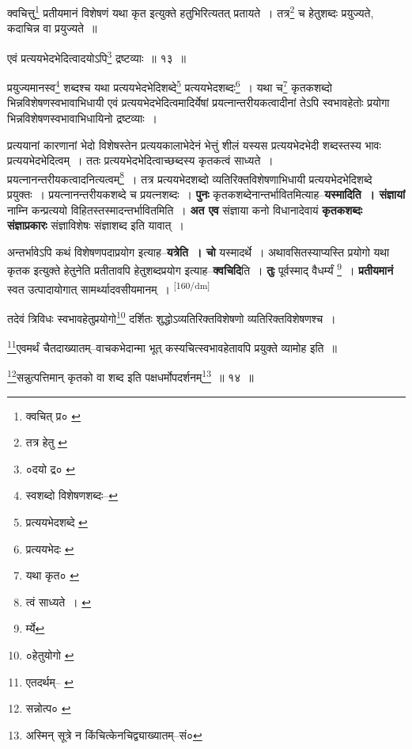 \documentclass[article,12pt,a4paper]{memoir}
\begin{document}
	क्वचित्तु\footnote{क्वचित् प्र० \cite{dp-msA} \cite{dp-msB} \cite{dp-edP} \cite{dp-edH} \cite{dp-edE} \cite{dp-edN}} प्रतीयमानं विशेषणं यथा कृत इत्युक्ते हतुभिरित्यतत् प्रतायते । तत्र\footnote{तत्र हेतु \cite{dp-msB}} च हेतुशब्दः प्रयुज्यते, कदाचिन्न वा प्रयुज्यते ॥ 
	  
	एवं प्रत्ययभेदभेदित्वादयोऽपि\footnote{०दयो द्र० \cite{dp-msB} \cite{dp-edP} \cite{dp-edH} \cite{dp-edE} \cite{dp-edN}} द्रष्टव्याः ॥ १३ ॥ 
	  
	प्रयुज्यमानस्व\footnote{स्वशब्दो विशेषणशब्दः--\cite{dp-msD-n}} शब्दश्च यथा प्रत्ययभेदभेदिशब्दे\footnote{प्रत्ययभेदशब्दे \cite{dp-msB}} प्रत्ययभेदशब्दः\footnote{प्रत्ययभेदः \cite{dp-msA} \cite{dp-msB} \cite{dp-edP} \cite{dp-edH} \cite{dp-edE} \cite{dp-edN}} । यथा च\footnote{यथा कृत० \cite{dp-msC}} कृतकशब्दो भिन्नविशेषणस्वभावाभिधायी एवं प्रत्ययभेदभेदित्वमादिर्येषां प्रयत्नान्तरीयकत्वादीनां तेऽपि स्वभावहेतोः प्रयोगा भिन्नविशेषणस्वभावाभिधायिनो द्रष्टव्याः । 
	  
	प्रत्ययानां कारणानां भेदो विशेषस्तेन प्रत्ययकालाभेदेनं भेत्तुं शीलं यस्यस प्रत्ययभेदभेदी शब्दस्तस्य भावः प्रत्ययभेदभेदित्वम् । ततः प्रत्ययभेदभेदित्वाच्छब्दस्य कृतकत्वं साध्यते । प्रयत्नानन्तरीयकत्वादनित्यत्वम्\footnote{त्वं साध्यते । \cite{dp-msA} \cite{dp-edP} \cite{dp-edH} \cite{dp-edE} \cite{dp-edN}} । तत्र प्रत्ययभेदशब्दो व्यतिरिक्तविशेषणाभिधायी प्रत्ययभेदभेदिशब्दे प्रयुक्तः । प्रयत्नानन्तरीयकशब्दे च प्रयत्नशब्दः । \textbf{पुनः} कृतकशब्देनान्तर्भावितमित्याह--\textbf{यस्मादिति । संज्ञायां} नाम्नि कन्प्रत्ययो विहितस्तस्मादन्तर्भावितमिति । \textbf{अत एव} संज्ञाया कनो विधानादेवायं \textbf{कृतकशब्दः संज्ञाप्रकारः} संज्ञाविशेषः संज्ञाशब्द इति यावात् ।
	\pend
      

	  \pstart अन्तर्भावेऽपि कथं विशेषणपदाप्रयोग इत्याह--\textbf{यत्रेति । चो} यस्मादर्थे । अथावसितस्याप्यस्ति प्रयोगो यथा कृतक इत्युक्ते हेतुनेति प्रतीतावपि हेतुशब्दप्रयोग इत्याह--\textbf{क्वचिदि}ति । \textbf{तुः} पूर्वस्माद् वैधर्म्यं \footnote{र्म्ये} । \textbf{प्रतीयमानं} स्वत उत्पादायोगात् सामर्थ्यादवसीयमानम् ।  \leavevmode\textsuperscript{\rmlatinfont\tiny [160/dm]} 
	  
	तदेवं त्रिविधः स्वभावहेतुप्रयोगो\footnote{०हेतुयोगो \cite{dp-msB}} दर्शितः शुद्धोऽव्यतिरिक्तविशेषणो व्यतिरिक्तविशेषणश्च । 
	  
	\footnote{एतदर्थम्--\cite{dp-msB} \cite{dp-msD}}एवमर्थं चैतदाख्यातम्--वाचकभेदान्मा भूत् कस्यचित्स्वभावहेतावपि प्रयुक्ते व्यामोह इति ॥ 
	  
	\footnote{सन्नोत्प० \cite{dp-edE}}सन्नुत्पत्तिमान् कृतको वा शब्द इति पक्षधर्मोपदर्शनम्\footnote{अस्मिन् सूत्रे न किंचित्केनचिद्व्याख्यातम्--सं०} ॥ १४ ॥ 
	  
\end{document}
